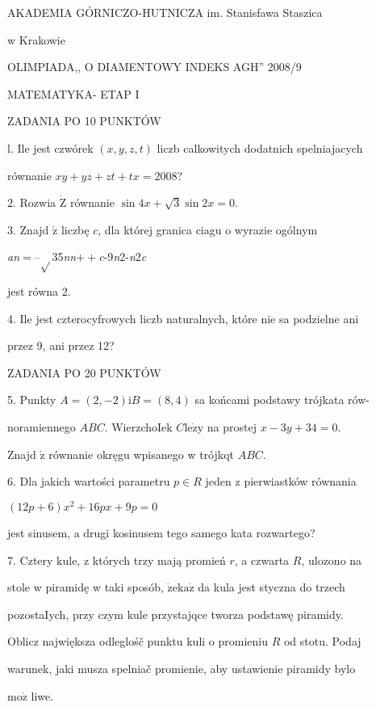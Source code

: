 \documentclass[a4paper,12pt]{article}
\begin{document}
AKADEMIA GÓRNICZO-HUTNICZA im. Stanisfawa Staszica

w Krakowie

OLIMPIADA,, O DIAMENTOWY INDEKS AGH'' 2008/9

MATEMATYKA- ETAP I

ZADANIA PO 10 PUNKTÓW

l. Ile jest czwórek $(x,y,z,t)$ liczb calkowitych dodatnich spelniajacych

równanie $xy+yz+zt+tx=2008$?

2. Rozwia $\dot{\mathrm{Z}}$ równanie $\sin 4x+\sqrt{3}\sin 2x=0.$

3. Znajd $\acute{\mathrm{z}}$ liczbę $c$, dla której granica ciagu o wyrazie ogólnym

{\it an}$=$--$\sqrt{}$35{\it nn}$++${\it c}-9{\it n}2-{\it n}2{\it c}

jest równa 2.

4. Ile jest czterocyfrowych liczb naturalnych, które nie sa podzielne ani

przez 9, ani przez 12?

ZADANIA PO 20 PUNKTÓW

5. Punkty $A= (2,-2) \mathrm{i}B= (8,4)$ sa końcami podstawy trójkata rów-

noramiennego $ABC$. WierzchoIek $C\mathrm{l}\mathrm{e}\dot{\mathrm{z}}\mathrm{y}$ na prostej $x-3y+34=0.$

Znajd $\acute{\mathrm{z}}$ równanie okręgu wpisanego w trójkqt $ABC.$

6. Dla jakich wartości parametru $p\in R$ jeden z pierwiastków równania

$(12p+6)x^{2}+16px+9p=0$

jest sinusem, a drugi kosinusem tego samego kata rozwartego?

7. Cztery kule, z których trzy mają promień $r$, a czwarta $R$, ulozono na

stole w piramidę w taki sposób, $\dot{\mathrm{z}}\mathrm{e}\mathrm{k}\mathrm{a}\dot{\mathrm{z}}$ da kula jest styczna do trzech

pozostaIych, przy czym kule przystajqce tworza podstawę piramidy.

Oblicz największa odleglośč punktu kuli o promieniu $R$ od stotu. Podaj

warunek, jaki musza spelniač promienie, aby ustawienie piramidy bylo

$\mathrm{m}\mathrm{o}\dot{\mathrm{z}}$ liwe.
\end{document}

